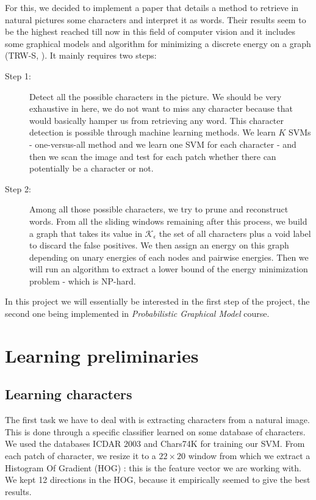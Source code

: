 \documentclass[10pt,a4paper]{article}
\begin{document}
For this, we decided to implement a paper \cite{Mis} that details a method to retrieve in natural pictures some characters and interpret it as words. Their results seem to be the highest reached till now in this field of computer vision and it includes some graphical models and algorithm for minimizing a discrete energy on a graph (TRW-S, \cite{Kol}). It mainly requires two steps:
\begin{description}
\item[Step 1:] Detect all the possible characters in the picture. We should be very exhaustive in here, we do not want to miss any character because that would basically hamper us from retrieving any word. This character detection is possible through machine learning methods. We learn $K$ SVMs - one-versus-all method and we learn one SVM for each character - and then we scan the image and test for each patch whether there can potentially be a character or not.

\item[Step 2:] Among all those possible characters, we try to prune and reconstruct words. From all the sliding windows remaining after this process, we build a graph that takes its value in $\mathcal{K}_{\epsilon}$ the set of all characters plus a void label to discard the false positives. We then assign an energy on this graph depending on unary energies of each nodes and pairwise energies. Then we will run an algorithm to extract a lower bound of the energy minimization problem - which is NP-hard. 
\end{description}
In this project we will essentially be interested in the first step of the project, the second one being implemented in \emph{Probabilistic Graphical Model} course.






\section{Learning preliminaries}

\subsection{Learning characters}

The first task we have to deal with is extracting characters from a natural image. This is done through a specific classifier learned on some database of characters. We used the databases ICDAR 2003 \cite{ICDARchar} and Chars74K \cite{Char74K} for training our SVM. From each patch of character, we resize it to a $22\times 20$ window from which we extract a Histogram Of Gradient (HOG) \cite{Dal2005}: this is the feature vector we are working with. We kept 12 directions in the HOG, because it empirically seemed to give the best results. \\
\end{document}
